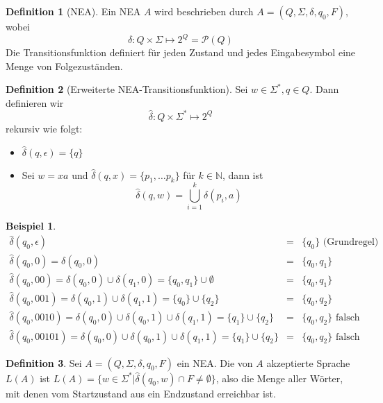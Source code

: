 \documentclass[11pt]{article} %
\theoremstyle{definition}
\newtheorem*{beispiel}{Beispiel}
\newtheorem{definition}{Definition}
\begin{document}
\begin{definition}[NEA]
Ein NEA $A$ wird beschrieben durch $A = (Q,\Sigma, \delta, q_0, F)$, wobei
\[
\delta: Q \times \Sigma \mapsto 2^Q = \mathcal{P}(Q)
\]
Die Transitionsfunktion definiert für jeden Zustand und jedes Eingabesymbol eine Menge von Folgezuständen.
\end{definition}

\begin{definition}[Erweiterte NEA-Transitionsfunktion]
Sei $w \in \Sigma^*, q \in Q$. Dann definieren wir
\[
\hat{\delta}: Q \times \Sigma^* \mapsto 2^Q
\]
rekursiv wie folgt:

\begin{itemize}
\item $\hat\delta(q, \epsilon) = \{ q \}$
\item Sei $w = xa$ und $\hat\delta(q, x) = \{p_1, \dots p_k\}$ für $k \in \mathbb{N}$, dann ist
\[
\hat\delta(q, w) = \bigcup\limits_{i=1}^k \delta(p_i, a)
\]
\end{itemize}
\end{definition}

\begin{beispiel}
\begin{eqnarray*}
\hat\delta(q_0, \epsilon) &=& \{q_0 \} \textrm{ (Grundregel)} \\
\hat\delta(q_0, 0) = \delta(q_0, 0) &=& \{q_0, q_1 \} \\
\hat\delta(q_0, 00) = \delta(q_0, 0) \cup \delta(q_1, 0) = \{q_0, q_1\} \cup \emptyset &=& \{q_0, q_1\} \\
\hat\delta(q_0, 001) = \delta(q_0, 1) \cup \delta(q_1, 1) = \{q_0\} \cup \{q_2\} &=& \{q_0, q_2\} \\
\hat\delta(q_0, 0010) = \delta(q_0, 0) \cup \delta(q_0, 1) \cup \delta(q_1, 1) = \{q_1\} \cup \{q_2\} &=& \{q_0, q_2\} \textrm{ falsch} \\
\hat\delta(q_0, 00101) = \delta(q_0, 0) \cup \delta(q_0, 1) \cup \delta(q_1, 1) = \{q_1\} \cup \{q_2\} &=& \{q_0, q_2\} \textrm{ falsch}
\end{eqnarray*}
\end{beispiel}

\begin{definition}
Sei $A = (Q, \Sigma, \delta, q_0, F)$ ein NEA. Die von $A$ akzeptierte Sprache $L(A)$ ist $L(A) = \{ w\in \Sigma^* | \hat\delta(q_0, w) \cap F \neq \emptyset\}$, also die Menge aller Wörter, mit denen vom Startzustand aus ein Endzustand erreichbar ist.
\end{definition}
\end{document}
